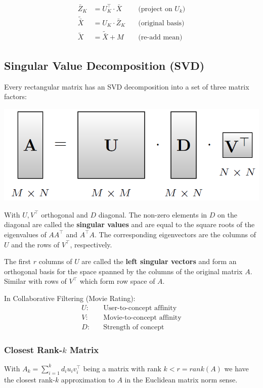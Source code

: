 \documentclass[a4paper,landscape,10pt]{article}
\begin{document}
\begin{multicols}{4}
\begin{align*}
    \bar{Z}_K       &= U_K^\top \cdot \bar{X} \quad &\text{(project on $U_k$)}\\
    \tilde{\bar{X}} &= U_K \cdot \bar{Z}_K    \quad &\text{(original basis)}\\
    \tilde{X}       &= \tilde{\bar{X}} + M    \quad &\text{(re-add mean)}
\end{align*}

\subsection{Singular Value Decomposition (SVD)}
Every rectangular matrix has an SVD decomposition into a set of three matrix
factors:

\includegraphics[width=0.9\linewidth]{svd-dimensions}

With $U, V^\top$ orthogonal and $D$ diagonal. The non-zero elements in $D$ on
the diagonal are called the {\bf singular values} and are equal to the square
roots of the eigenvalues of $AA^\top$ and $A^\top A$. The corresponding
eigenvectors are the columns of $U$ and the rows of $V^\top$, respectively.

The first $r$ columns of $U$ are called the {\bf left singular vectors} and form
an orthogonal basis for the space spanned by the columns of the original matrix
$A$. Similar with rows of $V^\top$ which form row space of $A$.

In Collaborative Filtering (Movie Rating):
\begin{align*}
    U: \quad &\text{User-to-concept affinity} \\
    V: \quad &\text{Movie-to-concept affinity} \\
    D: \quad &\text{Strength of concept}
\end{align*}

\subsubsection{Closest Rank-$k$ Matrix}
With $A_k = \sum_{i=1}^k d_i u_i v_i^\top$ being a matrix with rank $k < r =
rank(A)$ we have the closest rank-$k$ approximation to $A$ in the Euclidean
matrix norm sense. 


\end{multicols}
\end{document}

